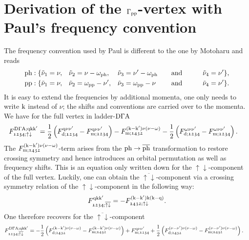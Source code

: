 \documentclass[main.tex]{subfiles}
\begin{document}
\newpage

\section{Derivation of the $\Gamma_{\text{pp}}$-vertex with Paul's frequency convention}

The frequency convention used by Paul is different to the one by Motoharu and reads
\begin{subequations}
\begin{align}
	&\text{ph}: \{\tilde\nu_1=\nu,&&\tilde\nu_2=\nu-\omega_{\text{ph}},&&\tilde\nu_3=\nu'-\omega_{\text{ph}}\qquad\text{and}\qquad&&\tilde\nu_4=\nu' \}, \\
	&\text{pp}: \{\tilde\nu_1=\nu,&&\tilde\nu_2=\omega_{\text{pp}}-\nu',&&\tilde\nu_3=\omega_{\text{pp}}-\nu\phantom{'}\qquad\text{and}\qquad&&\tilde\nu_4=\nu' \}.
\end{align}
\end{subequations}
It is easy to extend the frequencies by additional momenta, one only needs to write $\text{k}$ instead of $\nu$; the shifts and conventions are carried over to the momenta. We have for the full vertex in ladder-$\text{D}\Gamma\text{A}$ \cite{GallerThesis2017, GeorgRohringer2013}
\begin{align}
	F^{\text{D}\Gamma\text{A};\text{q}\text{k}\text{k}'}_{\mathfrak{1234};\uparrow\downarrow}&=\frac12\left (F_{\text{d};\mathfrak{1234}}^{\text{q}\nu\nu'}-F_{\text{m};\mathfrak{1234}}^{\text{q}\nu\nu'}\right )-F_{\text{m};\mathfrak{1432}}^{(\text{k}-\text{k}')\nu(\nu-\omega)}-\frac12\left (F_{\text{d};\mathfrak{1234}}^{\omega\nu\nu'}-F_{\text{m};\mathfrak{1234}}^{\omega\nu\nu'}\right ).
\end{align}
The $F_{\text{m};\mathfrak{1432}}^{(\text{k}-\text{k}')\nu(\nu-\omega)}$-term arises from the $\text{ph}\to\overline{\text{ph}}$ transformation to restore crossing symmetry and hence introduces an orbital permutation as well as frequency shifts. This is an equation only written down for the $\uparrow\downarrow$-component of the full vertex. Luckily, one can obtain the $\overline{\uparrow\downarrow}$-component via a crossing symmetry relation of the $\uparrow\downarrow$-component in the following way:
\begin{align}
	F^{\text{q}\text{k}\text{k}'}_{\mathfrak{1234};\overline{\uparrow\downarrow}}=-F^{(\text{k}-\text{k}')\text{k}(\text{k}-\text{q})}_{\mathfrak{1432};\uparrow\downarrow}.
\end{align}
One therefore recovers for the $\overline{\uparrow\downarrow}$-component
\begin{align}
	F^{\text{D}\Gamma\text{A};\text{q}\text{k}\text{k}'}_{\mathfrak{1234};\overline{\uparrow\downarrow}}&=-\frac12\left (F_{\text{d};\mathfrak{1432}}^{(\text{k}-\text{k}')\nu(\nu-\omega)}-F_{\text{m};\mathfrak{1432}}^{(\text{k}-\text{k}')\nu(\nu-\omega)}\right )+F_{\text{m};\mathfrak{1234}}^{\text{q}\nu\nu'}+\frac12\left (F_{\text{d};\mathfrak{1432}}^{(\nu-\nu')\nu(\nu-\omega)}-F_{\text{m};\mathfrak{1432}}^{(\nu-\nu')\nu(\nu-\omega)}\right ).
\end{align}
\end{document}

